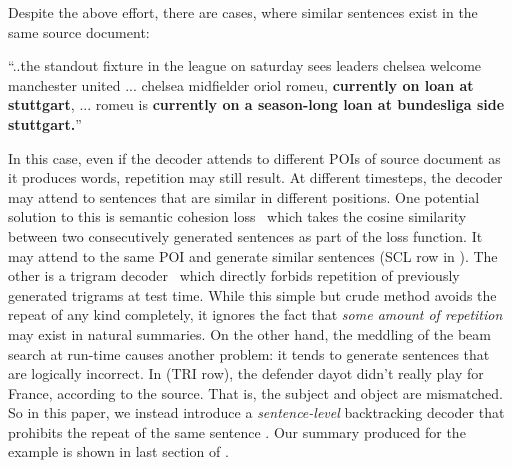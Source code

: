 Despite the above effort, there are cases, where similar sentences 
exist in the same source document:
\begin{example}
\label{ex:repeatsrc}
\small{``..the standout fixture in the league on saturday sees leaders 
	   chelsea welcome manchester united ... chelsea midfielder oriol romeu, 
\textbf{currently on loan at stuttgart}, ... romeu is 
\textbf{currently on a season-long loan at bundesliga side stuttgart.}''} 
\end{example}

In this case, even if the decoder attends to different POIs of 
source document as it produces words, repetition may still result.  
At different timesteps,
the decoder may attend 
to sentences that are similar in different positions.
One potential solution to this is semantic cohesion loss~\cite{elikyilmazBHC18}
which takes the cosine similarity between two consecutively generated sentences
as part of the loss function. It may attend to the same POI
and generate similar sentences (SCL row in ).  
The other is a trigram decoder~\cite{PaulusXS17} 
which directly forbids repetition of previously generated trigrams at test time. 
While this simple but crude method avoids the repeat of any kind
completely, 
it ignores the fact that \textit{some amount of repetition} may exist
in natural summaries.  
On the other hand, the meddling of the beam search at run-time causes another problem: 
it tends to generate sentences that are logically incorrect. 
In  (TRI row), the defender dayot didn't
really play for France, according to the source.
That is, the subject and object are mismatched.
So in this paper, we instead introduce a {\em sentence-level} backtracking decoder
that prohibits the repeat of the same sentence \DIFdelbegin {}\DIFdelend \DIFaddbegin {}\DIFaddend .
Our summary produced for the example is shown in last section of 
.

